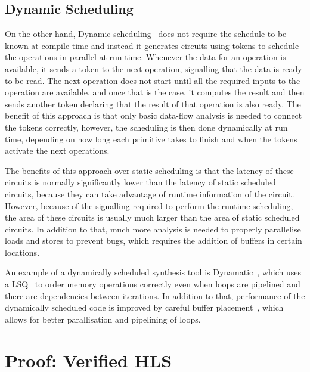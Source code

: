 \subsection{Dynamic Scheduling}%
\label{sec:dynamic_scheduling}

On the other hand, Dynamic scheduling~\cite{josipovic18_dynam_sched_high_level_synth} does not
require the schedule to be known at compile time and instead it generates circuits using tokens to
schedule the operations in parallel at run time.  Whenever the data for an operation is available,
it sends a token to the next operation, signalling that the data is ready to be read.  The next
operation does not start until all the required inputs to the operation are available, and once that
is the case, it computes the result and then sends another token declaring that the result of that
operation is also ready.  The benefit of this approach is that only basic data-flow analysis is
needed to connect the tokens correctly, however, the scheduling is then done dynamically at run
time, depending on how long each primitive takes to finish and when the tokens activate the next
operations.

The benefits of this approach over static scheduling is that the latency of these circuits is
normally significantly lower than the latency of static scheduled circuits, because they can take
advantage of runtime information of the circuit.  However, because of the signalling required to
perform the runtime scheduling, the area of these circuits is usually much larger than the area of
static scheduled circuits.  In addition to that, much more analysis is needed to properly
parallelise loads and stores to prevent bugs, which requires the addition of buffers in certain
locations.

An example of a dynamically scheduled synthesis tool is
Dynamatic~\cite{josipovic18_dynam_sched_high_level_synth}, which uses a
\gls{LSQ}~\cite{josipovic17_out_of_order_load_store} to order memory operations
correctly even when loops are pipelined and there are dependencies between
iterations.  In addition to that, performance of the dynamically scheduled code
is improved by careful buffer
placement~\cite{josipovic20_buffer_placem_sizin_high_perfor_dataf_circuit},
which allows for better parallisation and pipelining of loops.

\section{Proof: Verified HLS}

